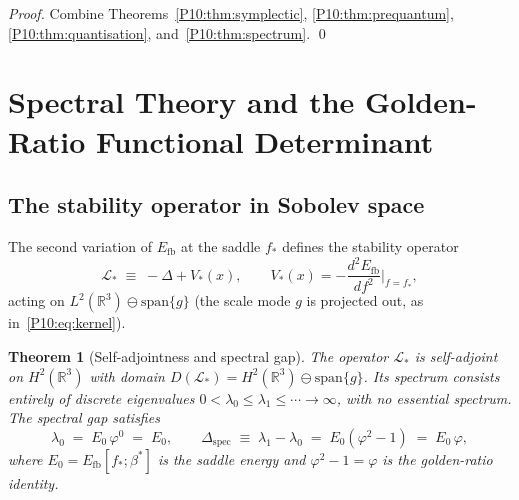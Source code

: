 \documentclass[11pt,a4paper]{article}
\newtheorem{theorem}{Theorem}[section]
\theoremstyle{definition}
\theoremstyle{remark}
\newcommand{\vp}{\varphi}
\newcommand{\bst}{\beta^{*}}
\newcommand{\Efb}{E_{\mathrm{fb}}}
\newcommand{\RR}{\mathbb{R}}
\begin{document}
\begin{proof}
Combine Theorems~\ref{P10:thm:symplectic},
\ref{P10:thm:prequantum}, \ref{P10:thm:quantisation},
and~\ref{P10:thm:spectrum}.
\qed
\end{proof}

\section{Spectral Theory and the Golden-Ratio Functional Determinant}
\label{P10:sec:spectral}

\subsection{The stability operator in Sobolev space}

The second variation of $\Efb$ at the saddle $f_*$ defines the
stability operator
\begin{equation}
  \mathcal{L}_*
  \;\equiv\; -\Delta + V_*(x),
  \qquad
  V_*(x) = -\frac{d^2\Efb}{df^2}\bigg|_{f=f_*},
  \label{P10:eq:stab_op}
\end{equation}
acting on $L^2(\RR^3)\ominus\mathrm{span}\{g\}$
(the scale mode $g$ is projected out, as in~\eqref{P10:eq:kernel}).

\begin{theorem}[Self-adjointness and spectral gap]
\label{P10:thm:selfadjoint}
The operator $\mathcal{L}_*$ is self-adjoint on $H^2(\RR^3)$
with domain $D(\mathcal{L}_*) = H^2(\RR^3)\ominus\mathrm{span}\{g\}$.
Its spectrum consists entirely of discrete eigenvalues
$0 < \lambda_0 \leq \lambda_1 \leq \cdots \to \infty$,
with no essential spectrum.
The spectral gap satisfies
\begin{equation}
  \lambda_0 \;=\; E_0\,\vp^0 \;=\; E_0,
  \qquad
  \Delta_\mathrm{spec} \;\equiv\; \lambda_1 - \lambda_0
  \;=\; E_0(\vp^2-1) \;=\; E_0\,\vp,
  \label{P10:eq:spectral_gap}
\end{equation}
where $E_0 = \Efb[f_*;\bst]$ is the saddle energy and
$\vp^2 - 1 = \vp$ is the golden-ratio identity.
\end{theorem}
\end{document}
